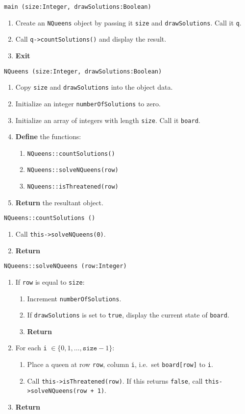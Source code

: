 \algorithm
\texttt{main (size:Integer, drawSolutions:Boolean)}
\begin{enumerate}
	\item Create an \texttt{NQueens} object by passing it \texttt{size} and \texttt{drawSolutions}. Call it \texttt{q}.
	\item Call \texttt{q->countSolutions()} and display the result.
	\item \textbf{Exit} 
\end{enumerate}
\vspace{8mm}
\texttt{NQueens (size:Integer, drawSolutions:Boolean)}
\begin{enumerate}
	\item Copy \texttt{size} and \texttt{drawSolutions} into the object data.
	\item Initialize an integer \texttt{numberOfSolutions} to zero. 
	\item Initialize an array of integers with length \texttt{size}. Call it \texttt{board}.
	\item \textbf{Define} the functions:
	\begin{enumerate}
		\item \texttt{NQueens::countSolutions()}
		\item \texttt{NQueens::solveNQueens(row)}
		\item \texttt{NQueens::isThreatened(row)}
	\end{enumerate}
	\item \textbf{Return} the resultant object.
\end{enumerate}
\vspace{5mm}
\texttt{NQueens::countSolutions ()}
\begin{enumerate}
	\item Call \texttt{this->solveNQueens(0)}.
	\item \textbf{Return} 
\end{enumerate}
\vspace{5mm}
\texttt{NQueens::solveNQueens (row:Integer)}
\begin{enumerate}
	\item If \texttt{row} is equal to \texttt{size}:
	\begin{enumerate}
		\item Increment \texttt{numberOfSolutions}.
		\item If \texttt{drawSolutions} is set to \texttt{true}, display the current state of \texttt{board}.
		\item \textbf{Return} 
	\end{enumerate}
	\item For each \texttt{i} $\in \{0, 1, \dots, \mathtt{size} - 1\}$:
	\begin{enumerate}
		\item Place a queen at row \texttt{row}, column \texttt{i}, i.e.\ set \texttt{board[row]} to \texttt{i}.
		\item Call \texttt{this->isThreatened(row)}. If this returns \texttt{false}, call \texttt{this->solveNQueens(row + 1)}. 
	\end{enumerate}
	\item \textbf{Return} 
\end{enumerate}
